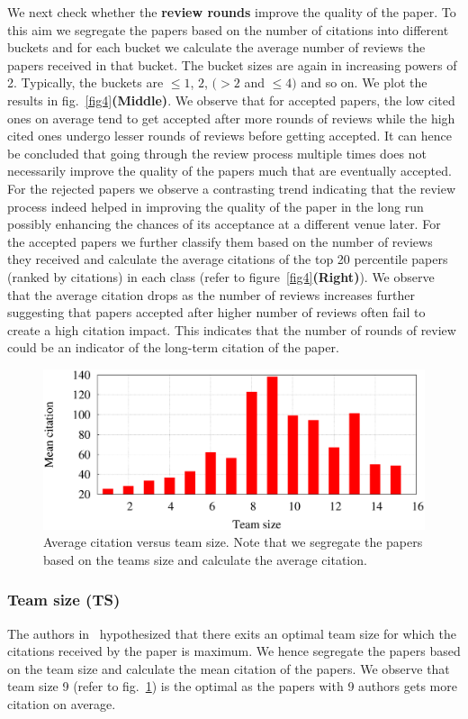 We next check whether the {\bf review rounds} improve the quality of the paper. To this aim we segregate the papers based on the number of citations into different buckets and for each bucket we calculate the average number of reviews the papers received in that bucket. The bucket sizes are again in increasing powers of 2. Typically, the buckets are $\leq 1$, $2$, $(>2$ and $\leq 4)$ and so on. We plot the results in fig.~\ref{fig4}{\bf (Middle)}. We observe that for accepted papers, the low cited ones on average tend to get accepted after more rounds of reviews while the high cited ones undergo lesser rounds of reviews before getting accepted. It can hence be concluded that going through the review process multiple times does not necessarily improve the quality of the papers much that are eventually accepted. For the rejected papers we observe a contrasting trend indicating that the review process indeed helped in improving the quality of the paper in the long run possibly enhancing the chances of its acceptance at a different venue later. For the accepted papers we further classify them based on the number of reviews they received and calculate the average citations of the top 20 percentile papers (ranked by citations) in each class (refer to figure~\ref{fig4}{\bf (Right)}). We observe that the average citation drops as the number of reviews increases further suggesting that papers accepted after higher number of reviews often fail to create a high citation impact. This indicates that the number of rounds of review could be an indicator of the long-term citation of the paper. 

\begin{figure}
\centering
\includegraphics[scale  = 0.25]{figures/team_citation}
\caption{\label{team:citation} Average citation versus team size. Note that we segregate the papers based on the teams size and calculate the average citation.}
\end{figure}


\subsubsection{Team size (TS)}
The authors in~\cite{chakraborty2014towards} hypothesized that there exits an optimal team size for which the citations received by the paper is maximum. We hence segregate the papers based on the team size and calculate the mean citation of the papers. We observe that team size 9 (refer to fig.~\ref{team:citation}) is the optimal as the papers with 9 authors gets more citation on average.

\medskip